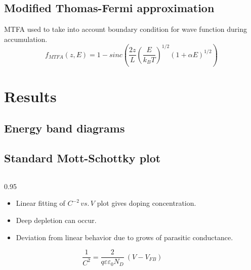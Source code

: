 \documentclass[final]{beamer}
\newcommand{\figfont}{\normalsize} %
\begin{document}
\begin{poster}
       
\subsection{Modified Thomas-Fermi approximation}
    MTFA used to take into account boundary condition for wave function during accumulation.  
    $$
    f_{MTFA}(z, E)  = 1 - sinc\left( \frac{2z}{L} \left(\frac{E}{k_BT}\right)^{1/2} \left(1+\alpha E\right)^{1/2}\right)
    $$
    
\newcolumn

\section{Results} \justifying
\subsection{Energy band diagrams}
        \centering{
        \figfont
        
        }
\vspace*{-4ex}

\subsection{Standard Mott-Schottky plot}
\newcommand{\figwidth}{0.53\columnwidth}
\begin{columns}[c]
    \begin{column}{0.95\columnwidth-\figwidth}
        \begin{itemize}   \itemsep15pt    
            \item  Linear fitting of $C^{-2}\,vs.\,V$ plot gives doping concentration.
            \item Deep depletion can occur.
            \item Deviation from linear behavior due to grows of parasitic conductance.
        \end{itemize}

        $$
        \frac1{C^2}=\frac2{q\varepsilon\varepsilon_0 N_D} \
                    \left( V- V_{FB} \right)
        $$

    \end{column}
    
    \begin{column}{0.005\columnwidth}
    \end{column}
    

\end{columns}
\end{poster}
\end{document}
